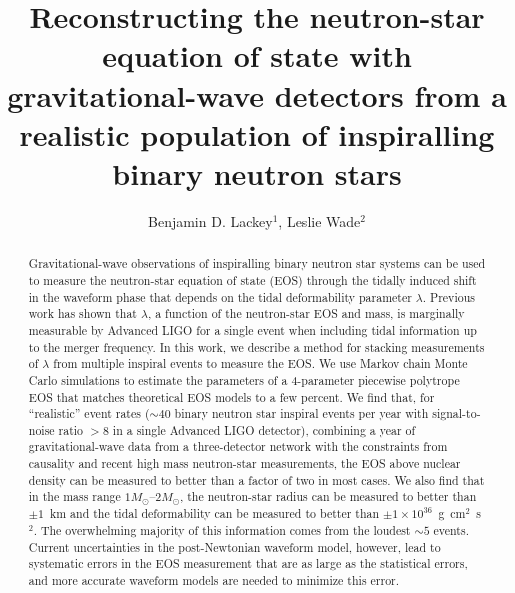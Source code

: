 \documentclass[twocolumn,prd,amssymb,aps,nofootinbib,showpacs,epsf]{revtex4}
\begin{document}
\title{Reconstructing the neutron-star equation of state with gravitational-wave detectors from a realistic population of inspiralling binary neutron stars}

\author{Benjamin D. Lackey$^1$, Leslie Wade$^2$}


\begin{abstract}
Gravitational-wave observations of inspiralling binary neutron star systems can be used to measure the neutron-star equation of state (EOS) through the tidally induced shift in the waveform phase that depends on the tidal deformability parameter $\lambda$. Previous work has shown that $\lambda$, a function of the neutron-star EOS and mass, is marginally measurable by Advanced LIGO for a single event when including tidal information up to the merger frequency. In this work, we describe a method for stacking measurements of $\lambda$ from multiple inspiral events to measure the EOS. We use Markov chain Monte Carlo simulations to estimate the parameters of a 4-parameter piecewise polytrope EOS that matches theoretical EOS models to a few percent. We find that, for ``realistic'' event rates ($\sim 40$ binary neutron star inspiral events per year with signal-to-noise ratio $> 8$ in a single Advanced LIGO detector), combining a year of gravitational-wave data from a three-detector network with the constraints from causality and recent high mass neutron-star measurements, the EOS above nuclear density can be measured to better than a factor of two in most cases. We also find that in the mass range $1M_\odot$--$2M_\odot$, the neutron-star radius can be measured to better than $\pm 1$~km and the tidal deformability can be measured to better than $\pm 1 \times 10^{36}$~g~cm$^2$~s$^2$. The overwhelming majority of this information comes from the loudest $\sim 5$ events. Current uncertainties in the post-Newtonian waveform model, however, lead to systematic errors in the EOS measurement that are as large as the statistical errors, and more accurate waveform models are needed to minimize this error.
\end{abstract}

\end{document}
